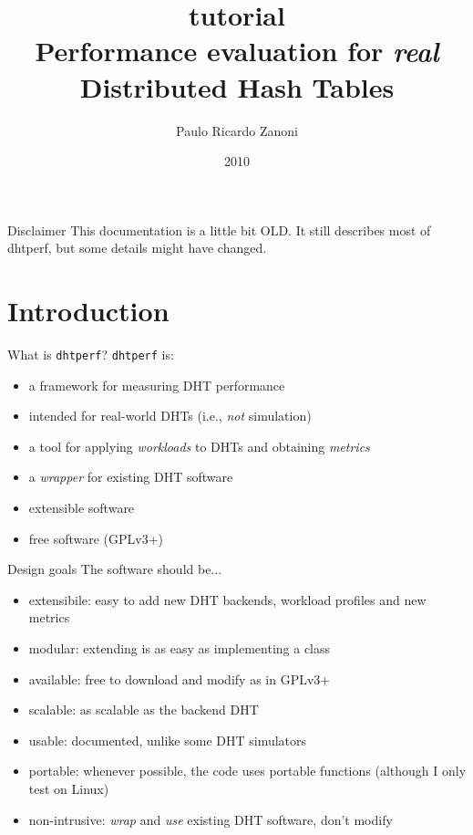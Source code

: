 \documentclass[compress]{beamer}
\title[\dhtperf{} tutorial]{\dhtperf{} tutorial\\Performance evaluation for
\emph{real} Distributed Hash Tables}
\author{Paulo Ricardo Zanoni}
\institute{UFPR -- Universidade Federal do Paraná}
\date{2010}
\newcommand{\dhtperf}{\texttt{dhtperf}}
\begin{document}
\begin{frame}
\titlepage
\end{frame}


\begin{frame}{Disclaimer}
This documentation is a little bit OLD. It still describes most of dhtperf, but
some details might have changed.
\end{frame}

\section{Introduction}
\begin{frame}{What is \dhtperf?}
\dhtperf{} is:
\begin{itemize}
    \item a framework for measuring DHT performance
    \item intended for real-world DHTs (i.e., \emph{not} simulation)
    \item a tool for applying \emph{workloads} to DHTs and obtaining
    \emph{metrics}
    \item a \emph{wrapper} for existing DHT software
    \item extensible software
    \item free software (GPLv3+)
\end{itemize}
\end{frame}

\begin{frame}{Design goals}
The software should be...
\begin{itemize}
    \item extensibile: easy to add new DHT backends, workload profiles and
    new metrics
    \item modular: extending is as easy as implementing a class
    \item available: free to download and modify as in GPLv3+
    \item scalable: as scalable as the backend DHT
    \item usable: documented, unlike some DHT simulators
    \item portable: whenever possible, the code uses portable functions
    (although I only test on Linux)
    \item non-intrusive: \emph{wrap} and \emph{use} existing DHT software,
    don't modify
\end{itemize}
\end{frame}
\end{document}
